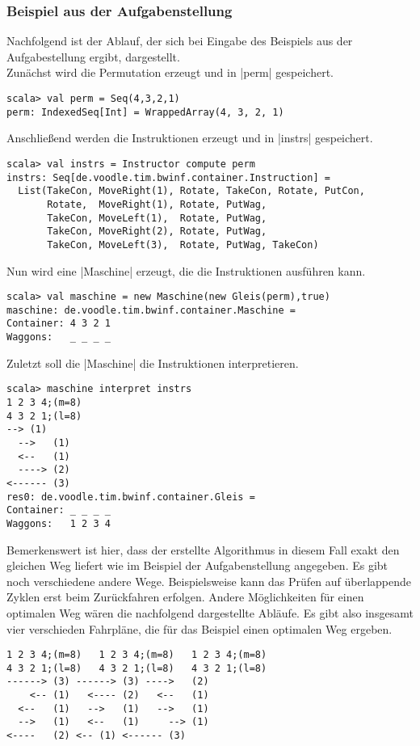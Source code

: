 \subsubsection{Beispiel aus der Aufgabenstellung}
Nachfolgend ist der Ablauf, der sich bei Eingabe des Beispiels aus der Aufgabestellung ergibt, dargestellt. \\
Zunächst wird die Permutation erzeugt und in |perm| gespeichert.
\begin{lstlisting}
scala> val perm = Seq(4,3,2,1)               
perm: IndexedSeq[Int] = WrappedArray(4, 3, 2, 1)
\end{lstlisting}
Anschließend werden die Instruktionen erzeugt und in |instrs| gespeichert.
\begin{lstlisting}
scala> val instrs = Instructor compute perm
instrs: Seq[de.voodle.tim.bwinf.container.Instruction] =
  List(TakeCon, MoveRight(1), Rotate, TakeCon, Rotate, PutCon,
       Rotate,  MoveRight(1), Rotate, PutWag,
       TakeCon, MoveLeft(1),  Rotate, PutWag,
       TakeCon, MoveRight(2), Rotate, PutWag,
       TakeCon, MoveLeft(3),  Rotate, PutWag, TakeCon)
\end{lstlisting}
Nun wird eine |Maschine| erzeugt, die die Instruktionen ausführen kann.
\begin{lstlisting}
scala> val maschine = new Maschine(new Gleis(perm),true)
maschine: de.voodle.tim.bwinf.container.Maschine = 
Container: 4 3 2 1
Waggons:   _ _ _ _
\end{lstlisting}
Zuletzt soll die |Maschine| die Instruktionen interpretieren.
\begin{lstlisting}
scala> maschine interpret instrs                        
1 2 3 4;(m=8)
4 3 2 1;(l=8)
-->	(1)
  -->	(1)
  <--	(1)
  ---->	(2)
<------	(3)
res0: de.voodle.tim.bwinf.container.Gleis = 
Container: _ _ _ _
Waggons:   1 2 3 4
\end{lstlisting}
Bemerkenswert ist hier, dass der erstellte Algorithmus in diesem Fall exakt den gleichen Weg liefert wie im Beispiel der Aufgabenstellung angegeben.
Es gibt noch verschiedene andere Wege.
Beispielsweise kann das Prüfen auf überlappende Zyklen erst beim Zurückfahren erfolgen.
Andere Möglichkeiten für einen optimalen Weg wären die nachfolgend dargestellte Abläufe.
Es gibt also insgesamt vier verschieden Fahrpläne, die für das Beispiel einen optimalen Weg ergeben.
\begin{lstlisting}                   
1 2 3 4;(m=8)	1 2 3 4;(m=8)	1 2 3 4;(m=8)
4 3 2 1;(l=8)	4 3 2 1;(l=8)	4 3 2 1;(l=8)
------>	(3)	------>	(3)	---->	(2)
    <--	(1)	  <----	(2)	  <--	(1)
  <--	(1)	  -->	(1)	  -->	(1)
  -->	(1)	  <--	(1)	    -->	(1)
<----	(2)	<--	(1)	<------	(3)
\end{lstlisting}
\newpage
